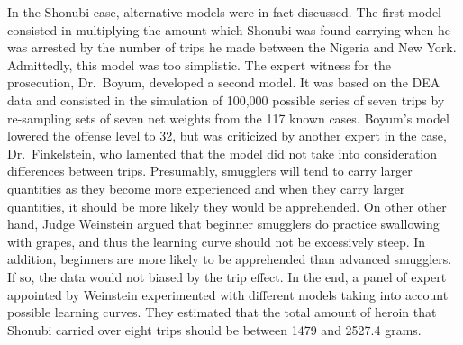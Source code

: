 \documentclass{article}
\begin{document}
 In the Shonubi case, alternative models were in fact discussed.
 The first model consisted in multiplying the amount which Shonubi was found carrying when he was arrested by the number of trips he made between the Nigeria and New York. Admittedly, this model was too simplistic. The expert witness for the prosecution, Dr.\ Boyum, developed a second model. It was based on the DEA data and consisted in the simulation of 100,000 possible series of seven trips by re-sampling sets of seven net weights from the 117 known cases. Boyum's model lowered the offense level to 32, but was criticized by another expert in the case, Dr.\ Finkelstein, who lamented that the model did not take into consideration  differences between trips. Presumably, smugglers will tend to carry larger quantities as they become more experienced and when they carry larger quantities, it should be more likely they would be apprehended. %
%
  On other other hand, Judge Weinstein argued that beginner smugglers do practice swallowing with grapes, and thus the learning curve should not be excessively steep. In addition, beginners are more likely to be apprehended than advanced smugglers. If so, the data would not biased by the trip effect. In the end, 
     a panel of expert appointed by Weinstein experimented with different models taking into account possible learning curves. They estimated that the total amount of heroin that Shonubi carried over eight trips should be between 1479 and 2527.4 grams. %
\end{document}
